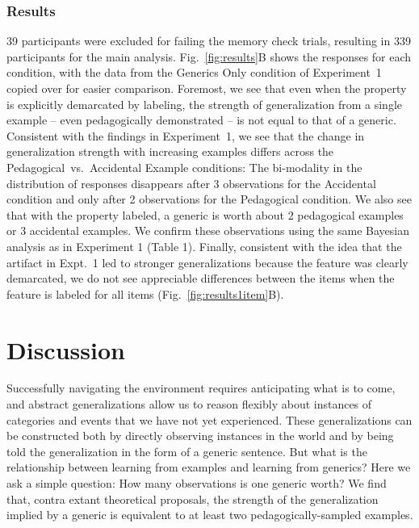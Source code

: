 \documentclass[10pt,letterpaper]{article}
\begin{document}
\subsubsection{Results}
39 participants were excluded for failing the memory check trials, resulting in 339 participants for the main analysis.
Fig.~\ref{fig:results}B shows the responses for each condition, with the data from the Generics Only condition of Experiment~1 copied over for easier comparison. 
Foremost, we see that even when the property is explicitly demarcated by labeling, the strength of generalization from a single example -- even pedagogically demonstrated -- is not equal to that of a generic. 
Consistent with the findings in Experiment~1, we see that the change in generalization strength with increasing examples differs across the Pedagogical~vs.~Accidental Example conditions: 
The bi-modality in the distribution of responses disappears after 3 observations for the Accidental condition and only after 2 observations for the Pedagogical condition. 
We also see that with the property labeled, a generic is worth about 2 pedagogical examples or 3 accidental examples. 
We confirm these observations using the same Bayesian analysis as in Experiment 1 (Table 1). 
Finally, consistent with the idea that the artifact in Expt.~1 led to stronger generalizations because the feature was clearly demarcated, we do not see appreciable differences between the items when the feature is labeled for all items (Fig.~\ref{fig:results1item}B).

\section{Discussion}

Successfully navigating the environment requires anticipating what is to come, and abstract generalizations allow us to reason flexibly about instances of categories and events that we have not yet experienced. 
These generalizations can be constructed both by directly observing instances in the world and by being told the generalization in the form of a generic sentence. 
But what is the relationship between learning from examples and learning from generics? 
Here we ask a simple question: How many observations is one generic worth?
We find that, contra extant theoretical proposals, the strength of the generalization implied by a generic is equivalent to at least two pedagogically-sampled examples. 
\end{document}
